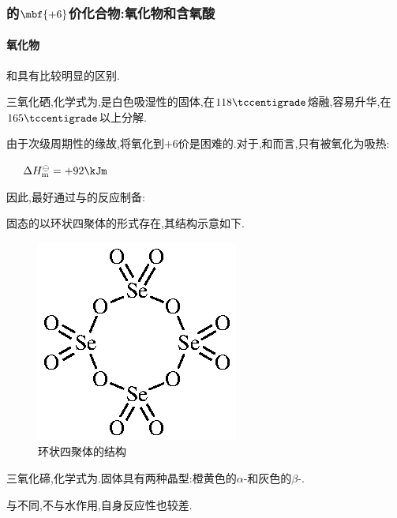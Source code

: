\documentclass{ctexart}
\begin{document}
\subsubsection{的$\mbf{+6}$价化合物:氧化物和含氧酸}
\paragraph{氧化物}
和具有比较明显的区别.
\begin{substance}[\ce{SeO3}]
    三氧化硒,化学式为,是白色吸湿性的固体,在$118\tccentigrade$熔融,容易升华,在$165\tccentigrade$以上分解.
\end{substance}
由于次级周期性的缘故,将氧化到$+6$价是困难的.对于,和而言,只有被氧化为吸热:
\begin{center}
    \ \ \ $\Delta H_\text{m}^\ominus=+92\kJm$
\end{center}
因此,最好通过与的反应制备:
\begin{center}
\end{center}
固态的以环状四聚体的形式存在,其结构示意如下.
\begin{figure}[H]
    \centering\includegraphics{picture/SeO3.eps}
    \caption{环状四聚体的结构}
\end{figure}
\begin{substance}[\ce{TeO3}]
    三氧化碲,化学式为.固体具有两种晶型:橙黄色的$\alpha$-和灰色的$\beta$-.
\end{substance}
与不同,不与水作用,自身反应性也较差.
\end{document}
